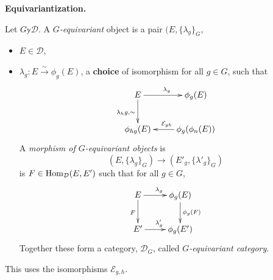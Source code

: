\medskip\noindent
{\bf Equivariantization.}

\begin{definition}
\label{definition-G-equivariant-object}
Let $G \mathbb{y}\mathcal{D}$. A {\it $G$-equivariant} object is a pair
$(E,\{\lambda_g\}_G$,
\begin{itemize}
\item $E \in \mathcal{D}$,
\item $\lambda_g:E \xrightarrow{\sim}\phi_g(E)$, a {\bf choice} of isomorphism
for all $g\in G$, such that
$$
\xymatrix{
E\ar[r]^{\lambda_g}\ar[d]_{\lambda_hg,\sim}&\phi_g(E)\\
\phi_{hg}(E)&\phi_g(\phi_n(E))\ar[l]_{\mathcal{E}_{gh}}
}
$$
A {\it morphism of $G$-equivariant objects} is 
$$
(E,\{\lambda_g\}_G)\to(E'_g,\{\lambda'_g\}_G)
$$
is $F \in \mathop{\mathrm{Hom}}\nolimits_\mathcal{D}(E,E')$ such that for all $g \in G$,
$$
\xymatrix{
E\ar[d]_F\ar[r]^{\lambda_g}&\phi_g(E)\ar[d]^{\phi_g(F)}\\
E'\ar[r]^{\lambda'_g}&\phi_g(E')
}
$$
Together these form a category, $\mathcal{D}_G$, called {\it $G$-equivariant
category}.
\end{itemize}
\end{definition}

\begin{remark}
\label{remark-uses-isomorphisms-Egh}
This uses the isomorphisms $\mathcal{E}_{g,h}$.
\end{remark}

